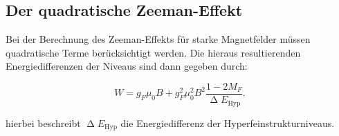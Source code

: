 \subsection{Der quadratische Zeeman-Effekt}
\label{subsec:QuadZeeman}

Bei der Berechnung des Zeeman-Effekts für starke Magnetfelder müssen quadratische Terme berücksichtigt werden. Die hieraus resultierenden Energiedifferenzen der
Niveaus sind dann gegeben durch:

\begin{equation}
  W = g_F\mu_\text{0}B+g^2_F\mu^2_\text{0}B^2\frac{1-2M_F}{\upDelta E_\text{Hyp}}.
  \label{eq:quadratisch}
\end{equation}

\noindent
hierbei beschreibt $\upDelta E_\text{Hyp}$ die Energiedifferenz der Hyperfeinstrukturniveaus.

